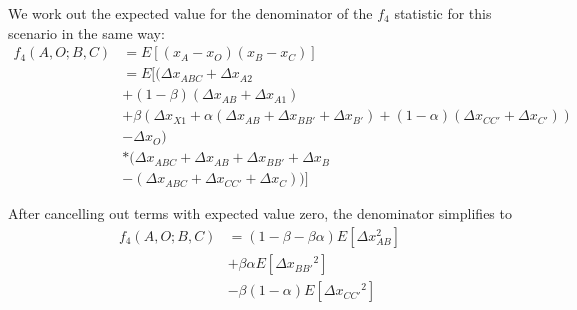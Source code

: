\documentclass[12pt]{report}
\begin{document}
\begin{enumerate}
	We work out the expected value for the denominator of the $f_4$ statistic for this scenario in the same way:
	\begin{align*}
	f_4(A,O;B,C) &= E[(x_A - x_O)(x_B - x_C)] \\
	&= E[(\Delta{x_{ABC}} + \Delta{x_{A2}} \\
	&+ (1 - \beta)(\Delta{x_{AB}} + \Delta{x_{A1}}) \\
	&+ \beta(\Delta{x_{X1}} + \alpha(\Delta{x_{AB}} + \Delta{x_{BB'}} + \Delta{x_{B'}}) + (1 - \alpha)(\Delta{x_{CC'}} + \Delta{x_{C'}})) \\
	&- \Delta{x_{O}}) \\
	&*(\Delta{x_{ABC}} + \Delta{x_{AB}} + \Delta{x_{BB'}} + \Delta{x_{B}}\\
	&- (\Delta{x_{ABC}} + \Delta{x_{CC'}} + \Delta{x_C}))]
	\end{align*}

	After cancelling out terms with expected value zero, the denominator simplifies to
	\begin{align*}
	f_4(A,O;B,C) &= (1 - \beta - \beta\alpha)E[\Delta{x_{AB}^2}] \\
	&+ \beta\alpha E[\Delta{x_{BB'}}^2] \\
	&- \beta(1 - \alpha)E[\Delta{x_{CC'}}^2]
	\end{align*}
	

\end{enumerate}
\end{document}

